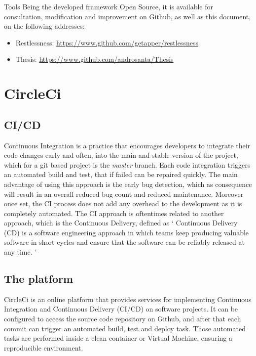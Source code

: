 \begin{chapter}{Tools}
    \bigskip
    \bigskip
    \noindent
    Being the developed framework Open Source, it is available for consultation,
    modification and improvement on Github, as well as this document, on the
    following addresses:
    \begin{itemize}
        \item Restlessness: \url{https://www.github.com/getapper/restlessness}
        \item Thesis: \url{https://www.github.com/androsanta/Thesis}
    \end{itemize}

    \section{CircleCi}

    \subsection{CI/CD}
    Continuous Integration is a practice that encourages developers to integrate
    their code changes early and often, into the main and stable version of the
    project, which for a git based project is the \textit{master} branch.
    Each code integration triggers an automated build and test, that if failed can
    be repaired quickly.
    The main advantage of using this approach is the early bug detection, which
    as consequence will result in an overall reduced bug count and reduced
    maintenance. Moreover once set, the CI process does not add any overhead to
    the development as it is completely automated.
    The CI approach is oftentimes related to another approach, which is the
    Continuous Delivery, defined as
    \enquote*{%
        Continuous Delivery (CD) is a software engineering approach in which teams
        keep producing valuable software in short cycles and ensure that the
        software can be reliably released at any time.%
    } \cite{continuous_delivery}

    \subsection{The platform}
    CircleCi is an online platform that provides services for implementing
    Continuous Integration and Continuous Delivery (CI/CD) on software projects.
    It can be configured to access the source code repository on Github, and after
    that each commit can trigger an automated build, test and deploy task.
    Those automated tasks are performed inside a clean container or Virtual Machine,
    ensuring a reproducible environment.


\end{chapter}
